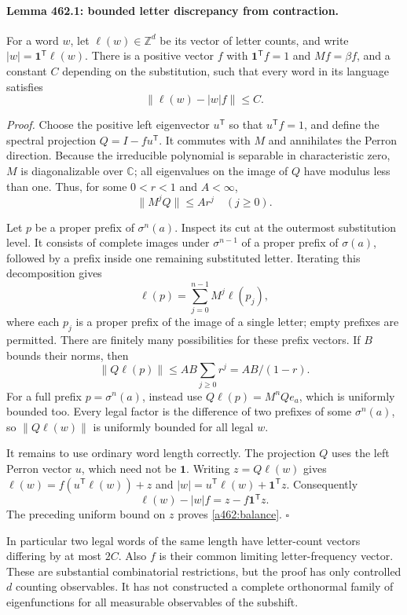 \documentclass[11pt]{article}
\begin{document}
\paragraph{Lemma 462.1: bounded letter discrepancy from contraction.}
For a word $w$, let $\ell(w)\in\mathbb Z^d$ be its vector of letter
counts, and write $|w|=\mathbf1^{\mathsf T}\ell(w)$. There is a positive
vector $f$ with $\mathbf1^{\mathsf T}f=1$ and $Mf=\beta f$, and a
constant $C$ depending on the substitution, such that every word in its
language satisfies
\begin{equation}\label{a462:balance}
 \|\ell(w)-|w|f\|\le C.
\end{equation}

\emph{Proof.} Choose the positive left eigenvector $u^{\mathsf T}$ so
that $u^{\mathsf T}f=1$, and define the spectral projection
$Q=I-fu^{\mathsf T}$. It commutes with $M$ and annihilates the Perron
direction. Because the irreducible polynomial is separable in characteristic
zero, $M$ is diagonalizable over $\mathbb C$; all eigenvalues on the image
of $Q$ have modulus less than one. Thus, for some $0<r<1$ and $A<\infty$,
\[
 \|M^jQ\|\le Ar^j\quad(j\ge0).
\]

Let $p$ be a proper prefix of $\sigma^n(a)$. Inspect its cut at the
outermost substitution level. It consists of complete images under
$\sigma^{n-1}$ of a proper prefix of $\sigma(a)$, followed by a prefix
inside one remaining substituted letter. Iterating this decomposition gives
\[
 \ell(p)=\sum_{j=0}^{n-1}M^j\ell(p_j),
\]
where each $p_j$ is a proper prefix of the image of a single letter;
empty prefixes are permitted. There are finitely many possibilities for
these prefix vectors. If $B$ bounds their norms, then
\[
 \|Q\ell(p)\|\le AB\sum_{j\ge0}r^j=AB/(1-r).
\]
For a full prefix $p=\sigma^n(a)$, instead use
$Q\ell(p)=M^nQe_a$, which is uniformly bounded too. Every legal factor
is the difference of two prefixes of some $\sigma^n(a)$, so
$\|Q\ell(w)\|$ is uniformly bounded for all legal $w$.

It remains to use ordinary word length correctly. The projection $Q$
uses the left Perron vector $u$, which need not be $\mathbf1$.
Writing $z=Q\ell(w)$ gives
$\ell(w)=f(u^{\mathsf T}\ell(w))+z$ and
$|w|=u^{\mathsf T}\ell(w)+\mathbf1^{\mathsf T}z$.
Consequently
\[
 \ell(w)-|w|f=z-f\mathbf1^{\mathsf T}z.
\]
The preceding uniform bound on $z$ proves \eqref{a462:balance}.
\hfill$\square$

In particular two legal words of the same length have letter-count
vectors differing by at most $2C$. Also $f$ is their common limiting
letter-frequency vector. These are substantial combinatorial restrictions,
but the proof has only controlled $d$ counting observables. It has not
constructed a complete orthonormal family of eigenfunctions for all
measurable observables of the subshift.
\end{document}

